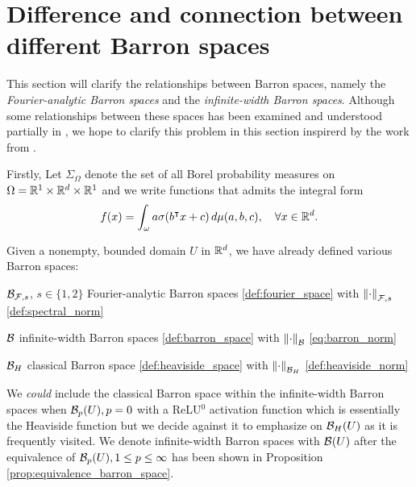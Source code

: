 \section{Difference and connection between different Barron spaces}
\label{sec:diff_barron_spaces}

This section will clarify the relationships between  Barron spaces, namely the
\textit{Fourier-analytic Barron spaces} and the \textit{infinite-width Barron
spaces}. Although some relationships between these spaces has been examined and
understood partially in
\cite{eBarronSpaceFlowinduced2021,eMathematicalUnderstandingNeural2020}, we hope
to clarify this problem in this section inspirerd by the work from
\cite{carageaNeuralNetworkApproximation2022}.

Firstly, Let $\Sigma_{\Omega}$ denote the set of all Borel probability
measures on $\Omega = \mathbb{R}^1 \times \mathbb{R}^d \times \mathbb{R}^1$ and we write functions that
admits the integral form
\begin{equation}
    \label{eq:integral_represent}
    f(x) = \int_{\omega} a\sigma(b{}^{\intercal} x + c) \,d\mu(a,b,c), \quad
    \forall x \in \mathbb{R}^d.
\end{equation}

Given a nonempty, bounded domain $U$ in $\mathbb{R}^d$, we have already defined various
Barron spaces:

\begin{itemize}
    \item $\mathcal{B}_{\mathcal{F}, s}$, $s \in \{1,2\}$ Fourier-analytic Barron spaces 
        \eqref{def:fourier_space} with $\left\| \cdot \right\|_{\mathcal{F},s}$ 
        \eqref{def:spectral_norm}
    \item $\mathcal{B}$ infinite-width Barron spaces \eqref{def:barron_space} with
        $\left\| \cdot \right\|_{\mathcal{B}}$ \eqref{eq:barron_norm}
    {
        \setlength\itemindent{25pt}
        \item $\mathcal{B}_{H}$ classical Barron space \eqref{def:heaviside_space}
            with $\left\| \cdot \right\|_{\mathcal{B}_H}$ \eqref{def:heaviside_norm}
    }
\end{itemize}

We \textit{could} include the classical Barron space within the infinite-width
Barron spaces when $\mathcal{B}_{p}(U), p=0$ with a ReLU$^0$ activation function
which is essentially the Heaviside function but we decide against it to
emphasize on $\mathcal{B}_{H}(U)$ as it is frequently visited. We denote
infinite-width Barron spaces with $\mathcal{B}_{}(U)$ after the equivalence of
$\mathcal{B}_{p}(U), 1\leq p \leq\infty$ has been shown in Proposition
\ref{prop:equivalence_barron_space}.

